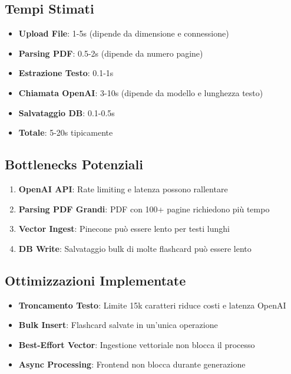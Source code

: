 \documentclass[11pt,a4paper]{article}
\begin{document}
\subsection{Tempi Stimati}

\begin{itemize}
    \item \textbf{Upload File}: 1-5s (dipende da dimensione e connessione)
    \item \textbf{Parsing PDF}: 0.5-2s (dipende da numero pagine)
    \item \textbf{Estrazione Testo}: 0.1-1s
    \item \textbf{Chiamata OpenAI}: 3-10s (dipende da modello e lunghezza testo)
    \item \textbf{Salvataggio DB}: 0.1-0.5s
    \item \textbf{Totale}: 5-20s tipicamente
\end{itemize}

\subsection{Bottlenecks Potenziali}

\begin{enumerate}
    \item \textbf{OpenAI API}: Rate limiting e latenza possono rallentare
    \item \textbf{Parsing PDF Grandi}: PDF con 100+ pagine richiedono più tempo
    \item \textbf{Vector Ingest}: Pinecone può essere lento per testi lunghi
    \item \textbf{DB Write}: Salvataggio bulk di molte flashcard può essere lento
\end{enumerate}

\subsection{Ottimizzazioni Implementate}

\begin{itemize}
    \item \textbf{Troncamento Testo}: Limite 15k caratteri riduce costi e latenza OpenAI
    \item \textbf{Bulk Insert}: Flashcard salvate in un'unica operazione
    \item \textbf{Best-Effort Vector}: Ingestione vettoriale non blocca il processo
    \item \textbf{Async Processing}: Frontend non blocca durante generazione
\end{itemize}
\end{document}
